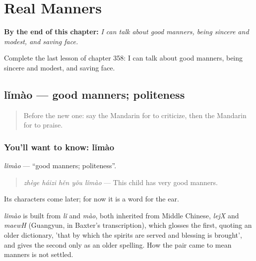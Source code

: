
\chapter{Real Manners}
\label{ch:zh-real-manners}

\begin{chapteropening}
\textbf{By the end of this chapter:} \emph{I can talk about good manners, being sincere and modest, and saving face.}

Complete the last lesson of chapter 358: I can talk about good manners, being sincere and modest, and saving face.
\end{chapteropening}

\section[lǐmào]{lǐmào — good manners; politeness}

\label{lesson:ZH-C358-limao}



\begin{quote}
Before the new one: say the Mandarin for to criticize, then the Mandarin for to praise.
\end{quote}

\subsection*{You'll want to know: lǐmào}
\emph{lǐmào} — \textquotedblleft{}good manners; politeness\textquotedblright{}.

\begin{quote}
\emph{zhège háizi hěn yǒu lǐmào} — This child has very good manners.
\end{quote}

Its characters come later; for now it is a word for the ear.

\begin{cousinweb}
\emph{lǐmào} is built from \emph{lǐ} and \emph{mào}, both inherited from Middle Chinese, \emph{lejX} and \emph{maewH} (Guangyun, in Baxter's transcription), which glosses the first, quoting an older dictionary, 'that by which the spirits are served and blessing is brought', and gives the second only as an older spelling. How the pair came to mean manners is not settled.
\end{cousinweb}

